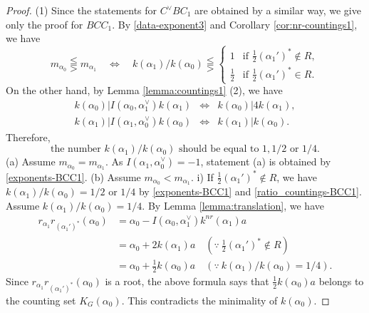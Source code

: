 \documentclass[11pt]{amsart}
\begin{document}
{{\begin{proof}
(1) Since the statements for $C^\vee BC_1$ are obtained by a similar 
way, we give only the proof for $BCC_1$. By \eqref{data-exponent3} and Corollary 
\ref{cor:nr-countings1}, we have
\begin{equation}\label{exponents-BCC1}
m_{\alpha_0}\lesseqqgtr m_{\alpha_1}\quad \Longleftrightarrow\quad
k(\alpha_1)/k(\alpha_0)\lesseqqgtr \begin{cases}
1 & \text{if }\tfrac12 (\alpha_1')^\ast\not\in R,\\
\tfrac12 & \text{if }\tfrac12 (\alpha_1')^\ast\in R.
\end{cases}
\end{equation}
On the other hand, by Lemma \ref{lemma:countings1} (2), we have
\[\begin{array}{lllll}
k(\alpha_0)| I(\alpha_0,\alpha_1^\vee)k(\alpha_1) & \Longleftrightarrow & 
k(\alpha_0) | 4k(\alpha_1),\\[3pt]
k(\alpha_1)| I(\alpha_1,\alpha_0^\vee)k(\alpha_0) & \Longleftrightarrow & 
k(\alpha_1)|k(\alpha_0).
\end{array}\]
Therefore, 
\begin{equation}\label{ratio_countings-BCC1}
\text{the number $k(\alpha_1)/k(\alpha_0)$ should be equal to $1,1/2$ or $1/4$.} 
\end{equation}
\vskip 3mm
\noindent
(a) Assume $m_{\alpha_0}=m_{\alpha_1}$. As $I(\alpha_1,\alpha_0^\vee)=-1$, 
statement (a) is obtained by \eqref{exponents-BCC1}. 
\vskip 3mm
\noindent
(b) Assume $m_{\alpha_0}<m_{\alpha_1}$. 
\vskip 1mm
\noindent
i) If $\tfrac12 (\alpha_1')^\ast\not\in R$, we have $k(\alpha_1)/k(\alpha_0)=1/2$ or 
$1/4$ by \eqref{exponents-BCC1} and \eqref{ratio_countings-BCC1}. 
Assume $k(\alpha_1)/k(\alpha_0)=1/4$. 
By Lemma \ref{lemma:translation}, we have
\begin{align*}
r_{\alpha_1}r_{(\alpha_1')^\ast}(\alpha_0)
&=\alpha_0-I(\alpha_0,\alpha_1^\vee)k^{nr}(\alpha_1)a\\
&=\alpha_0+2k(\alpha_1)a\quad (\because\ \tfrac12(\alpha_1')^\ast\not\in R)\\
&=\alpha_0+\tfrac12 k(\alpha_0)a\quad (\because\ k(\alpha_1)/k(\alpha_0)=1/4).
\end{align*}
Since $r_{\alpha_1}r_{(\alpha_1')^\ast}(\alpha_0)$
is a root, the above formula says that $\tfrac12 k(\alpha_0)a$ belongs to the 
counting set $K_G(\alpha_0)$. This contradicts the minimality of $k(\alpha_0)$.

\end{proof}}}
\end{document}

